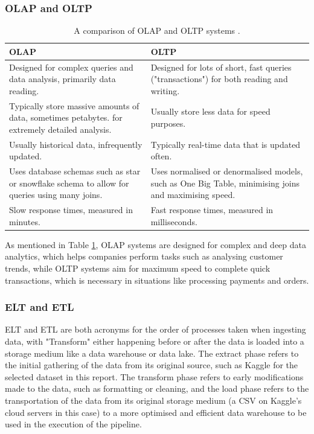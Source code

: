\documentclass[12pt]{report}
\begin{document}
\subsubsection{OLAP and OLTP}

\begin{table}[H]
    \centering
        \begin{tabular}{ |p{}| p{}|}
            \hline
            \cellcolor{blue!25}OLAP & \cellcolor{blue!25}OLTP\\
            \hline
            Designed for complex queries and data analysis, primarily data reading.
            & Designed for lots of short, fast queries ("transactions") for both reading and writing.\\
            \hline
            Typically store massive amounts of data, sometimes petabytes.
            for extremely detailed analysis. 
            & Usually store less data for speed purposes.\\
            \hline
            Usually historical data, infrequently updated. 
            & Typically real-time data that is updated often.\\
            \hline 
            Uses database schemas such as star or snowflake schema to allow for queries using many joins. 
            & Uses normalised or denormalised models, such as One Big Table, minimising joins and maximising speed.\\
            \hline
            Slow response times, measured in minutes. 
            & Fast response times, measured in milliseconds.\\
            \hline
    \end{tabular}
    \caption{A comparison of OLAP and OLTP systems \autocite{aws_oltp_nodate}.}\label{tab:OLAP-OLTP}
\end{table}

As mentioned in Table \ref{tab:OLAP-OLTP}, OLAP systems are designed for complex and deep data analytics, which helps 
companies perform tasks such as analysing customer trends, while OLTP systems aim for maximum speed to complete quick transactions, 
which is necessary in situations like processing payments and orders.

\subsubsection{ELT and ETL}
ELT and ETL are both acronyms for the order of processes taken when ingesting data, with "Transform" either 
happening before or after the data is loaded into a storage medium like a data warehouse or data lake. 
The extract phase refers to the initial gathering of the data from its original source, such as Kaggle for 
the selected dataset in this report. The transform phase refers to early modifications made to the data, such 
as formatting or cleaning, and the load phase refers to the transportation of the data from its original storage
medium (a CSV on Kaggle's cloud servers in this case) to a more optimised and efficient data warehouse to be used 
in the execution of the pipeline.
\end{document}
